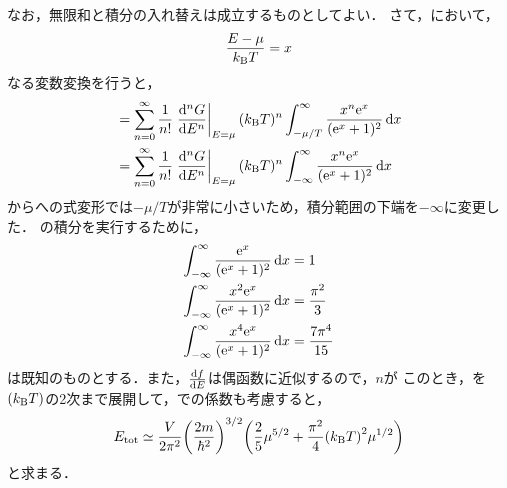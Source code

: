 \documentclass{report}
\begin{document}
        なお，無限和と積分の入れ替えは成立するものとしてよい．
        さて，において，
        \begin{align}
          \frac{E - \mu}{k_{\mathrm{B}} T} = x
        \end{align}
        なる変数変換を行うと，
        \begin{align}
          &= \sum_{n = 0}^{\infty}\frac{1}{n!}\left.\dv[n]{G}{E}\right|_{E = \mu} (k_{\mathrm{B}} T)^n \int_{-\mu/T}^{\infty}\frac{x^n\mathrm{e}^x}{(\mathrm{e}^x + 1)^2} \dd{x} \label{electron-energy-5} \\ 
          &= \sum_{n = 0}^{\infty}\frac{1}{n!}\left.\dv[n]{G}{E}\right|_{E = \mu} (k_{\mathrm{B}} T)^n \int_{-\infty}^{\infty}\frac{x^n\mathrm{e}^x}{(\mathrm{e}^x + 1)^2} \dd{x} \label{electron-energy-6}
        \end{align}
        からへの式変形では$-\mu/T$が非常に小さいため，積分範囲の下端を$-\infty$に変更した．
        の積分を実行するために，
        \begin{align}
          \int_{-\infty}^{\infty} \frac{\mathrm{e}^x}{(\mathrm{e}^x + 1)^2} \dd{x} &= 1 \\ 
          \int_{-\infty}^{\infty} \frac{x^2 \mathrm{e}^x}{(\mathrm{e}^x + 1)^2} \dd{x} &= \frac{\pi^2}{3} \\ 
          \int_{-\infty}^{\infty} \frac{x^4 \mathrm{e}^x}{(\mathrm{e}^x + 1)^2} \dd{x} &= \frac{7 \pi^4}{15}
        \end{align}
        は既知のものとする．また，$\dv{f}{E}$は偶函数に近似するので，$n$が
        このとき，を$(k_{\mathrm{B}} T)$の2次まで展開して，での係数も考慮すると，
        \begin{align}
          E_{\mathrm{tot}} \simeq \frac{V}{2\pi^2}\qty(\frac{2m}{\hbar^2})^{3/2}\qty(\frac{2}{5}\mu^{5/2} + \frac{\pi^2}{4}\qty(k_{\mathrm{B}} T)^2\mu^{1/2}) \label{electron-energy-7}
        \end{align}
        と求まる．
\end{document}
